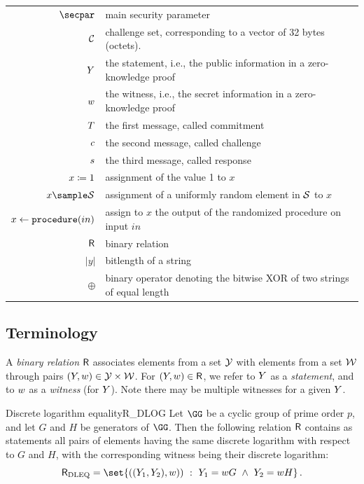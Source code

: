 \documentclass[11pt]{article}
\begin{document}
\begin{tabular}{r@{\hspace{1em}}p{11cm}}
    $\secpar$ & main security parameter\\
    $\mathcal{C}$ & challenge set, corresponding to a vector of 32 bytes (octets).\\
    $Y$ & the statement, i.e., the public information in a zero-knowledge proof \\
    $w$ & the witness, i.e., the secret information in a zero-knowledge proof \\
    $T$ & the first message, called commitment \\
    $c$ & the second message, called challenge \\
    $s$ & the third message, called response \\
    $x \coloneqq 1$ & assignment of the value 1 to $x$\\
    $x\sample\someset$ & assignment of a uniformly random element in $\mathcal{S}$ to $x$\\
    $x\gets\texttt{procedure}(in)$ & assign to $x$ the output of the randomized procedure on input $in$\\
    $\mathsf{R}$ & binary relation\\
    $|y|$ & bitlength of a string \\
    $\oplus$ & binary operator denoting the bitwise XOR of two strings of equal length
\end{tabular}

\subsection{Terminology}
A \emph{binary relation} $\mathsf{R}$ associates elements from a set $\mathcal{Y}$ with elements from a set $\mathcal{W}$ through pairs $(Y,w)\in\mathcal{Y}\times\mathcal{W}$.
For $(Y,w)\in\mathsf{R}$, we refer to $Y$ as a \emph{statement}, and to $w$ as a \emph{witness} (for $Y$).
Note there may be multiple witnesses for a given $Y$.

\begin{example}{Discrete logarithm equality}{R_DLOG}
  Let $\GG$ be a cyclic group of prime order $p$, and let $G$ and $H$ be generators of $\GG$.
	Then the following relation $\mathsf{R}$ contains as statements all pairs of elements having the same discrete logarithm with respect to $G$ and $H$, with the corresponding witness being their discrete logarithm:
  $$
	  \relation_{\operatorname{DLEQ}} = \set{\left((\statement_1,\statement_2),\witness)\right)~:~\statement_1=\witness G ~\land~ \statement_2=\witness H}\,.
	$$
\end{example}
\end{document}
